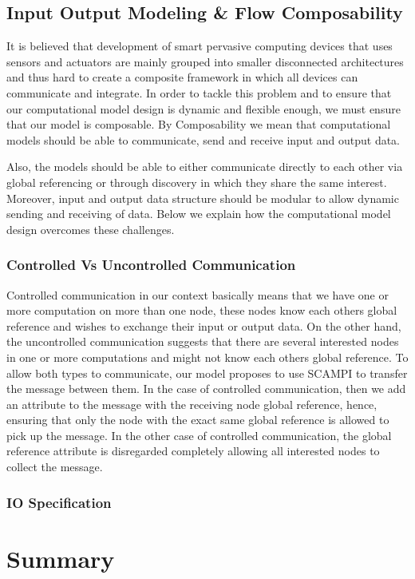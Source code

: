 \subsection{Input Output Modeling \& Flow Composability}
It is believed that development of smart pervasive computing devices that uses sensors and actuators are mainly grouped into smaller disconnected architectures and thus hard to create a composite framework in which all devices can communicate and integrate\cite{5470524}. In order to tackle this problem and to ensure that our computational model design is dynamic and flexible enough, we must ensure that our model is composable. By Composability we mean that computational models should be able to communicate, send and receive input and output data. 

Also, the models should be able to either communicate directly to each other via global referencing or through discovery in which they share the same interest. Moreover, input and output data structure should be modular to allow dynamic sending and receiving of data. Below we explain how the computational model design overcomes these challenges. 

\subsubsection{Controlled Vs Uncontrolled Communication}
Controlled communication in our context basically means that we have one or more computation on more than one node, these nodes know each others global reference and wishes to exchange their input or output data. On the other hand, the uncontrolled communication suggests that there are several interested nodes in one or more computations and might not know each others global reference.
To allow both types to communicate, our model proposes to use SCAMPI to transfer the message between them. In the case of controlled communication, then we add an attribute to the message with the receiving node global reference, hence, ensuring that only the node with the exact same global reference is allowed to pick up the message. In the other case of controlled communication, the global reference attribute is disregarded completely allowing all interested nodes to collect the message.

\newpage
\subsubsection{IO Specification}


\newpage


\section{Summary}



